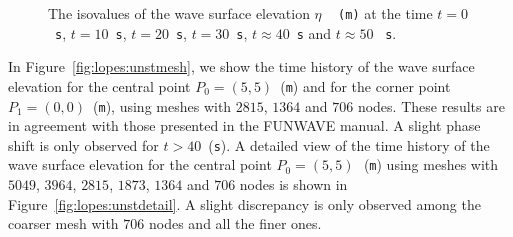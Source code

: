 \begin{figure}
    \caption{The isovalues of the wave surface elevation $\eta$\,~{\tt
        (m)} at the time $t=0$~{\tt s}, $t=10$~{\tt s}, $t=20$~{\tt s},
      $t=30$~{\tt s}, $t\approx40$~{\tt s} and $t\approx50$ ~{\tt s}.}
  \label{fig:lopes:symmetry}
\end{figure}

In Figure~\ref{fig:lopes:unstmesh}, we show the time history of the
wave surface elevation for the central point $P_0=(5,5)$~({\tt m}) and
for the corner point $P_1=(0,0)$~({\tt m}), using meshes with $2815$,
$1364$ and $706$ nodes.  These results are in agreement with those
presented in the FUNWAVE manual. A slight phase shift is only observed
for $t>40$~({\tt s}).  A detailed view of the time history of the wave
surface elevation for the central point $P_0=(5,5)$\,~({\tt m}) using
meshes with $5049$, $3964$, $2815$, $1873$, $1364$ and $706$ nodes is
shown in Figure~\ref{fig:lopes:unstdetail}. A slight discrepancy is
only observed among the coarser mesh with $706$ nodes and all the
finer ones.

